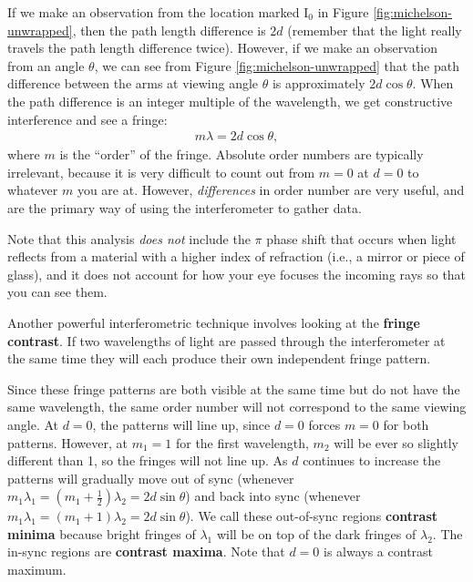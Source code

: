 \documentclass[]{manual}
\begin{document}
    If we make an observation from the location marked I$_0$ in Figure \ref{fig:michelson-unwrapped}, then the path length difference is $2d$ (remember that the light really travels the path length difference twice). However, if we make an observation from an angle $\theta$, we can see from Figure \ref{fig:michelson-unwrapped} that the path difference between the arms at viewing angle $\theta$ is approximately $2d \cos{\theta}$.
    When the path difference is an integer multiple of the wavelength, we get constructive interference and see a fringe:
    \begin{align}
    m \lambda = 2 d \cos{\theta},
    \end{align}
    where $m$ is the ``order'' of the fringe. Absolute order numbers are typically irrelevant, because it is very difficult to count out from $m=0$ at $d=0$ to whatever $m$ you are at.
    However, \textit{differences} in order number are very useful, and are the primary way of using the interferometer to gather data.

    Note that this analysis \textit{does not} include the $\pi$ phase shift that occurs when light reflects from a material with a higher index of refraction (i.e., a mirror or piece of glass), and it does not account for how your eye focuses the incoming rays so that you can see them.

    Another powerful interferometric technique involves looking at the \textbf{fringe contrast}.
    If two wavelengths of light are passed through the interferometer at the same time they will each produce their own independent fringe pattern.

    Since these fringe patterns are both visible at the same time but do not have the same wavelength, the same order number will not correspond to the same viewing angle.
    At $d=0$, the patterns will line up, since $d=0$ forces $m = 0$ for both patterns.
    However, at $m_1=1$ for the first wavelength, $m_2$ will be ever so slightly different than 1, so the fringes will not line up.
    As $d$ continues to increase the patterns will gradually move out of sync (whenever $m_1 \lambda_1 = \left(m_1+\frac{1}{2}\right) \lambda_2 = 2 d \sin{\theta}$) and back into sync (whenever $m_1 \lambda_1 = (m_1 + 1) \lambda_2 = 2 d \sin{\theta}$).
    We call these out-of-sync regions \textbf{contrast minima} because bright fringes of $\lambda_1$ will be on top of the dark fringes of $\lambda_2$. The in-sync regions are \textbf{contrast maxima}.
    Note that $d=0$ is always a contrast maximum.
\end{document}
